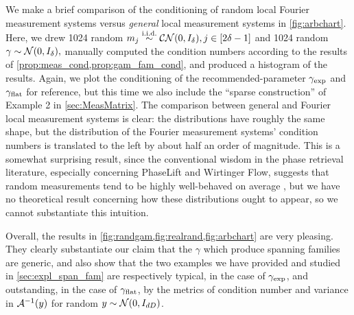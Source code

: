 We make a brief comparison of the conditioning of random local Fourier measurement systems versus \emph{general} local measurement systems in \cref{fig:arbchart}.  Here, we drew 1024 random $m_j \overset{\text{i.i.d.}}{\sim} \mathcal{C N}(0, I_\delta), j \in [2 \delta - 1]$ and 1024 random $\gamma \sim \mathcal{N}(0, I_\delta),$ manually computed the condition numbers according to the results of \cref{prop:meas_cond,prop:gam_fam_cond}, and produced a histogram of the results.  Again, we plot the conditioning of the recommended-parameter $\gamma_{\rm exp}$ and $\gamma_{\rm flat}$ for reference, but this time we also include the ``sparse construction'' of Example 2 in \cref{sec:MeasMatrix}.  The comparison between general and Fourier local measurement systems is clear: the distributions have roughly the same shape, but the distribution of the Fourier measurement systems' condition numbers is translated to the left by about half an order of magnitude.  This is a somewhat surprising result, since the conventional wisdom in the phase retrieval literature, especially concerning PhaseLift and Wirtinger Flow, suggests that random measurements tend to be highly well-behaved on average \cite{candes2015wtf,candes2011phaselift,kueng2015spherical,kueng2016clifford}, but we have no theoretical result concerning how these distributions ought to appear, so we cannot substantiate this intuition.

Overall, the results in \cref{fig:randgam,fig:realrand,fig:arbchart} are very pleasing.  They clearly substantiate our claim that the $\gamma$ which produce spanning families are generic, and also show that the two examples we have provided and studied in \cref{sec:expl_span_fam} are respectively typical, in the case of $\gamma_{\rm exp}$, and outstanding, in the case of $\gamma_{\rm flat}$, by the metrics of condition number and variance in $\mathcal{A}^{-1}(y)$ for random $y \sim \mathcal{N}(0, I_{d D})$.
